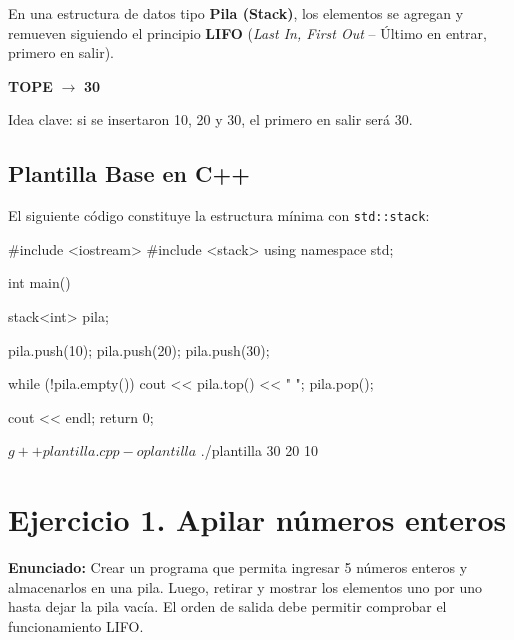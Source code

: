 \documentclass[11pt, a4paper]{article}
\begin{document}
En una estructura de datos tipo \textbf{Pila (Stack)}, los elementos se agregan y remueven siguiendo el principio \textbf{LIFO} (\textit{Last In, First Out} -- Último en entrar, primero en salir).

\begin{center}
    \begin{tcolorbox}[colback=brandNavy, colframe=brandBlue, width=0.7\textwidth, halign=center]
        {\Large \color{white} \textbf{TOPE} $\rightarrow$ \textbf{30}  } \par
        \vspace{2mm}
        {\small \color{brandCyan} Idea clave: si se insertaron 10, 20 y 30, el primero en salir será 30.}
    \end{tcolorbox}
\end{center}

\subsection*{Plantilla Base en C++}

El siguiente código constituye la estructura mínima con \texttt{std::stack}:

\begin{codebox}[title={PLANTILLA BASE EN C++}]
#include <iostream>
#include <stack>
using namespace std;

int main() {
    stack<int> pila;

    pila.push(10);
    pila.push(20);
    pila.push(30);

    while (!pila.empty()) {
        cout << pila.top() << " ";
        pila.pop();
    }

    cout << endl;
    return 0;
}
\end{codebox}

\begin{terminalout}
$ g++ plantilla.cpp -o plantilla
$ ./plantilla
30 20 10
\end{terminalout}

\newpage

\section*{Ejercicio 1. Apilar números enteros}

\textbf{Enunciado:} Crear un programa que permita ingresar 5 números enteros y almacenarlos en una pila. Luego, retirar y mostrar los elementos uno por uno hasta dejar la pila vacía. El orden de salida debe permitir comprobar el funcionamiento LIFO.
\end{document}
